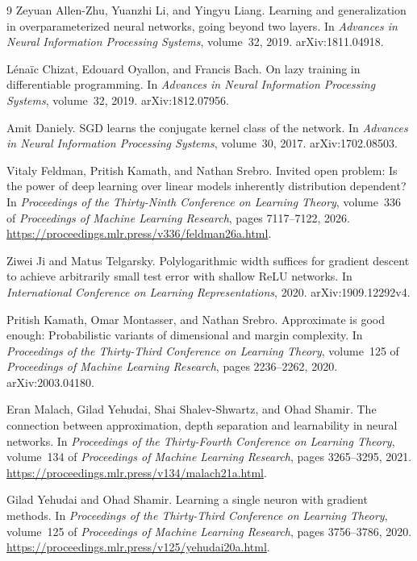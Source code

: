 \documentclass[11pt,letterpaper,pmlr,twoside]{jmlr}
\begin{document}
\begin{thebibliography}{9}
Zeyuan Allen-Zhu, Yuanzhi Li, and Yingyu Liang.
\newblock Learning and generalization in overparameterized neural networks, going beyond two layers.
\newblock In \emph{Advances in Neural Information Processing Systems}, volume~32, 2019.
\newblock arXiv:1811.04918.

L\'ena\"ic Chizat, Edouard Oyallon, and Francis Bach.
\newblock On lazy training in differentiable programming.
\newblock In \emph{Advances in Neural Information Processing Systems}, volume~32, 2019.
\newblock arXiv:1812.07956.

Amit Daniely.
\newblock SGD learns the conjugate kernel class of the network.
\newblock In \emph{Advances in Neural Information Processing Systems}, volume~30, 2017.
\newblock arXiv:1702.08503.

Vitaly Feldman, Pritish Kamath, and Nathan Srebro.
\newblock Invited open problem: Is the power of deep learning over linear models inherently distribution dependent?
\newblock In \emph{Proceedings of the Thirty-Ninth Conference on Learning Theory}, volume~336 of \emph{Proceedings of Machine Learning Research}, pages 7117--7122, 2026.
\newblock \url{https://proceedings.mlr.press/v336/feldman26a.html}.

Ziwei Ji and Matus Telgarsky.
\newblock Polylogarithmic width suffices for gradient descent to achieve arbitrarily small test error with shallow ReLU networks.
\newblock In \emph{International Conference on Learning Representations}, 2020.
\newblock arXiv:1909.12292v4.

Pritish Kamath, Omar Montasser, and Nathan Srebro.
\newblock Approximate is good enough: Probabilistic variants of dimensional and margin complexity.
\newblock In \emph{Proceedings of the Thirty-Third Conference on Learning Theory}, volume~125 of \emph{Proceedings of Machine Learning Research}, pages 2236--2262, 2020.
\newblock arXiv:2003.04180.

Eran Malach, Gilad Yehudai, Shai Shalev-Shwartz, and Ohad Shamir.
\newblock The connection between approximation, depth separation and learnability in neural networks.
\newblock In \emph{Proceedings of the Thirty-Fourth Conference on Learning Theory}, volume~134 of \emph{Proceedings of Machine Learning Research}, pages 3265--3295, 2021.
\newblock \url{https://proceedings.mlr.press/v134/malach21a.html}.

Gilad Yehudai and Ohad Shamir.
\newblock Learning a single neuron with gradient methods.
\newblock In \emph{Proceedings of the Thirty-Third Conference on Learning Theory}, volume~125 of \emph{Proceedings of Machine Learning Research}, pages 3756--3786, 2020.
\newblock \url{https://proceedings.mlr.press/v125/yehudai20a.html}.
\end{thebibliography}
\end{document}
